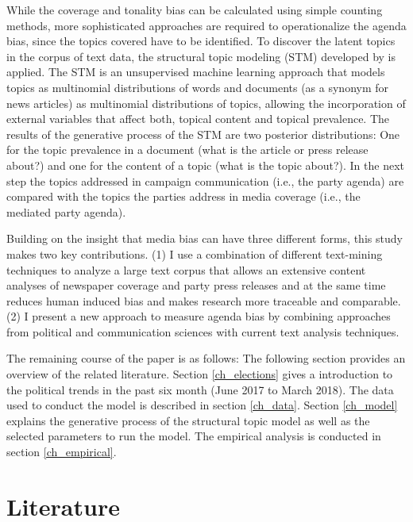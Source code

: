 \documentclass[12pt,a4paper,notitlepage]{article}
\begin{document}
While the coverage and tonality bias can be calculated using simple counting methods, more sophisticated approaches are required to operationalize the agenda bias, since the topics covered have to be identified. To discover the latent topics in the corpus of text data, the structural topic modeling (STM) developed by \citet{roberts_model_2016} is applied. The STM is an unsupervised machine learning approach that models topics as multinomial distributions of words and documents (as a synonym for news articles) as multinomial distributions of topics, allowing the incorporation of external variables that affect both, topical content and topical prevalence. The results of the generative process of the STM are two posterior distributions: One for the topic prevalence in a document (what is the article or press release about?) and one for the content of a topic (what is the topic about?). In the next step the topics addressed in campaign communication (i.e., the party agenda) are compared with the topics the parties address in media coverage (i.e., the mediated party agenda).

Building on the insight that media bias can have three different forms, this study makes two key contributions. (1) I use a combination of different text-mining techniques to analyze a large text corpus that allows an extensive content analyses of newspaper coverage and party press releases and at the same time reduces human induced bias and makes research more traceable and comparable. (2) I present a new approach to measure agenda bias by combining approaches from political and communication sciences with current text analysis techniques.    


The remaining course of the paper is as follows: The following section provides an overview of the related literature. Section \ref{ch_elections} gives a introduction to the political trends in the past six month (June 2017 to March 2018). The data used to conduct the model is described in section \ref{ch_data}. Section \ref{ch_model} explains the generative process of the structural topic model as well as the selected parameters to run the model. The empirical analysis is conducted in section \ref{ch_empirical}. 


\section{Literature}
\end{document}
